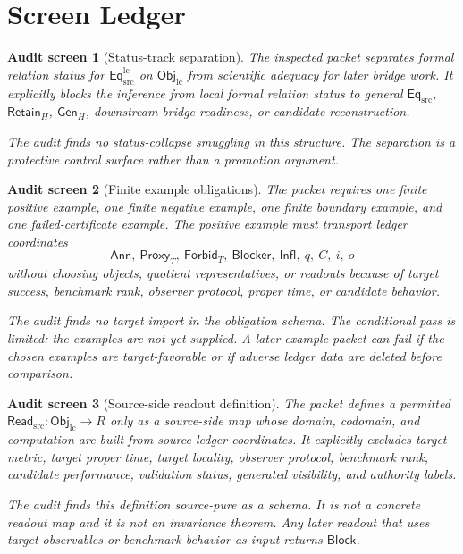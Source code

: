 \documentclass[11pt]{article}
\newcommand{\EqSrc}{\mathsf{Eq}_{\mathrm{src}}}
\newcommand{\EqLC}{\mathsf{Eq}_{\mathrm{src}}^{\mathrm{lc}}}
\newcommand{\ObjLC}{\mathsf{Obj}_{\mathrm{lc}}}
\newcommand{\ReadSrc}{\mathsf{Read}_{\mathrm{src}}}
\newcommand{\Ann}{\mathsf{Ann}}
\newcommand{\Proxy}{\mathsf{Proxy}_{T}}
\newcommand{\Forbid}{\mathsf{Forbid}_{T}}
\newcommand{\Blocker}{\mathsf{Blocker}}
\newcommand{\Infl}{\mathsf{Infl}}
\newcommand{\RetainH}{\mathsf{Retain}_{H}}
\newcommand{\GenH}{\mathsf{Gen}_{H}}
\newcommand{\Block}{\mathsf{Block}}
\newtheorem{screen}{Audit screen}
\begin{document}
\section{Screen Ledger}

\begin{screen}[Status-track separation]
The inspected packet separates formal relation status for \(\EqLC\) on
\(\ObjLC\) from scientific adequacy for later bridge work. It explicitly
blocks the inference from local formal relation status to general
\(\EqSrc\), \(\RetainH\), \(\GenH\), downstream bridge readiness, or
candidate reconstruction.

The audit finds no status-collapse smuggling in this structure. The
separation is a protective control surface rather than a promotion
argument.
\end{screen}

\begin{screen}[Finite example obligations]
The packet requires one finite positive example, one finite negative
example, one finite boundary example, and one failed-certificate
example. The positive example must transport ledger coordinates
\[
    \Ann,\ \Proxy,\ \Forbid,\ \Blocker,\ \Infl,\ q,\ C,\ i,\ o
\]
without choosing objects, quotient representatives, or readouts because
of target success, benchmark rank, observer protocol, proper time, or
candidate behavior.

The audit finds no target import in the obligation schema. The
conditional pass is limited: the examples are not yet supplied. A later
example packet can fail if the chosen examples are target-favorable or
if adverse ledger data are deleted before comparison.
\end{screen}

\begin{screen}[Source-side readout definition]
The packet defines a permitted \(\ReadSrc:\ObjLC\to R\) only as a
source-side map whose domain, codomain, and computation are built from
source ledger coordinates. It explicitly excludes target metric, target
proper time, target locality, observer protocol, benchmark rank,
candidate performance, validation status, generated visibility, and
authority labels.

The audit finds this definition source-pure as a schema. It is not a
concrete readout map and it is not an invariance theorem. Any later
readout that uses target observables or benchmark behavior as input
returns \(\Block\).
\end{screen}
\end{document}

